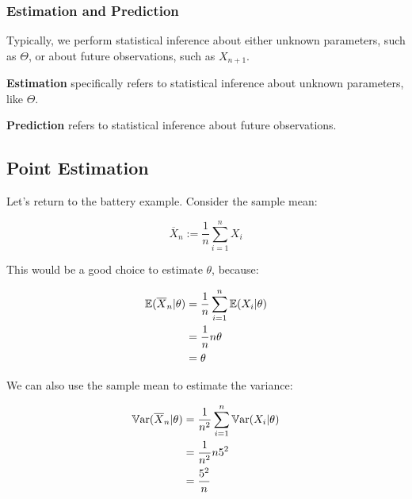 \documentclass[a4paper]{article}
\begin{document}
            \subsubsection{Estimation and Prediction}
                Typically, we perform statistical inference about either unknown
                parameters, such as $\Theta$, or about future observations, such
                as $X_{n+1}$.

                \begin{definition}
                    \textbf{Estimation} specifically refers to statistical
                    inference about unknown parameters, like $\Theta$.

                    \textbf{Prediction} refers to statistical inference about
                    future observations.
                \end{definition}

        \subsection{Point Estimation}
            \begin{fread}
                [MR03, section 7.2]
            \end{fread}

            Let's return to the battery example. Consider the sample mean:

            \[
                \overline X_n := \frac{1}{n} \sum_{i=1}^n X_i
            \]

            This would be a good choice to estimate $\theta$, because:

            \begin{align*}
                \mathbb{E}(\overline X_n | \theta) & = \frac{1}{n} \sum_{i = 1}^n \mathbb{E}(X_i
                    | \theta) \\
                & = \frac{1}{n}n\theta \\
                & = \theta
            \end{align*}

            We can also use the sample mean to estimate the variance:

            \begin{align*}
                \mathbb{V}\text{ar}(\overline X_n | \theta) & = \frac{1}{n^2} \sum_{i = 1}^n
                    \mathbb{V}\text{ar}(X_i | \theta) \\
                & = \frac{1}{n^2} n 5^2 \\
                & = \frac{5^2}{n}
            \end{align*}
\end{document}
